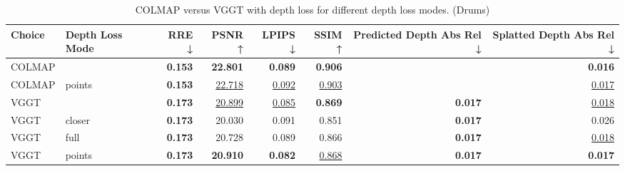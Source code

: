 \begin{table}[H]
\caption{\ifdefined\customcaption \customcaption \else COLMAP versus VGGT with depth loss for different depth loss modes. (Drums) \fi}
\label{tab:05_depth_loss_mode_drums}
\centering
\scriptsize
\begin{tabular}{llrrrrrr}
\toprule
Choice & Depth Loss Mode & RRE ↓ & PSNR ↑ & LPIPS ↓ & SSIM ↑ & Predicted Depth Abs Rel ↓ & Splatted Depth Abs Rel ↓ \\
\midrule
COLMAP &  & \textbf{0.153} & \textbf{22.801} & \textbf{0.089} & \textbf{0.906} &  & \textbf{0.016} \\
COLMAP & points & \textbf{0.153} & \underline{22.718} & \underline{0.092} & \underline{0.903} &  & \underline{0.017} \\
\midrule
VGGT &  & \textbf{0.173} & \underline{20.899} & \underline{0.085} & \textbf{0.869} & \textbf{0.017} & \underline{0.018} \\
VGGT & closer & \textbf{0.173} & 20.030 & 0.091 & 0.851 & \textbf{0.017} & 0.026 \\
VGGT & full & \textbf{0.173} & 20.728 & 0.089 & 0.866 & \textbf{0.017} & \underline{0.018} \\
VGGT & points & \textbf{0.173} & \textbf{20.910} & \textbf{0.082} & \underline{0.868} & \textbf{0.017} & \textbf{0.017} \\
\bottomrule
\end{tabular}
\end{table}